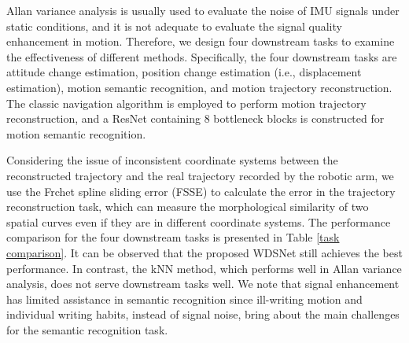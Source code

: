\documentclass[letterpaper]{article}
\begin{document}
	Allan variance analysis is usually used to evaluate the noise of IMU signals under static conditions, and it is not adequate to evaluate the signal quality enhancement in motion. Therefore, we design four downstream tasks to examine the effectiveness of different methods. Specifically, the four downstream tasks are attitude change estimation, position change estimation (i.e., displacement estimation), motion semantic recognition, and motion trajectory reconstruction. The classic navigation algorithm is employed to perform motion trajectory reconstruction, and a ResNet containing 8 bottleneck blocks is constructed for motion semantic recognition.


	Considering the issue of inconsistent coordinate systems between the reconstructed trajectory and the real trajectory recorded by the robotic arm, we use the Frchet spline sliding error (FSSE) \cite{10080916} to calculate the error in the trajectory reconstruction task, which can measure the morphological similarity of two spatial curves even if they are in different coordinate systems.
	The performance comparison for the four downstream tasks is presented in Table \ref{task comparison}.
	It can be observed that the proposed WDSNet still achieves the best performance. In contrast, the kNN method, which performs well in Allan variance analysis, does not serve downstream tasks well. We note that signal enhancement has limited assistance in semantic recognition since ill-writing motion and individual writing habits, instead of signal noise, bring about the main challenges for the semantic recognition task.
\end{document}
